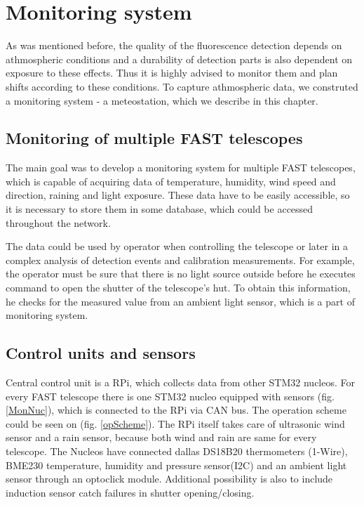 
\chapter{Monitoring system}
As was mentioned before, the quality of the fluorescence detection depends on athmospheric conditions and a durability of detection parts is also dependent on exposure to these effects. Thus it is highly advised to monitor them and plan shifts according to these conditions. To capture athmospheric data, we construted a monitoring system - a meteostation, which we describe in this chapter.
\section{Monitoring of multiple FAST telescopes}
The main goal was to develop a monitoring system for multiple FAST telescopes, which is capable of acquiring data of temperature, humidity, wind speed and direction, raining and light exposure. These data have to be easily accessible, so it is necessary to store them in some database, which could be accessed throughout the network. 
\par
The data could be used by operator when controlling the telescope or later in a complex analysis of detection events and calibration measurements. For example, the operator must be sure that there is no light source outside before he executes command to open the shutter of the telescope's hut. To obtain this information, he checks for the measured value from an ambient light sensor, which is a part of monitoring system.
\par

\section{Control units and sensors}
Central control unit is a RPi, which collects data from other STM32 nucleos. For every FAST telescope there is one STM32 nucleo equipped with sensors (fig. \ref{MonNuc}), which is connected to the RPi via CAN bus. The operation scheme could be seen on (fig. \ref{opScheme}). The RPi itself takes care of ultrasonic wind sensor and a rain sensor, because both wind and rain are same for every telescope. The Nucleos have connected dallas DS18B20 thermometers (1-Wire), BME230 temperature, humidity and pressure sensor(I2C) and an ambient light sensor through an optoclick module. Additional possibility is also to include induction sensor catch failures in shutter opening/closing.


